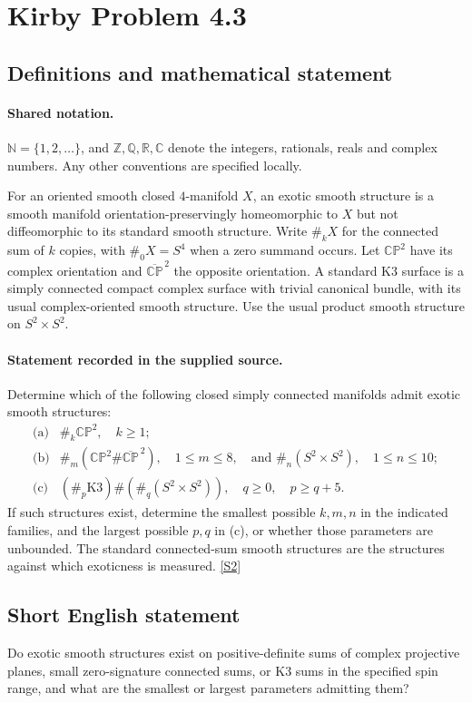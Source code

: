 \documentclass[11pt]{article}
\newcommand{\sref}[2]{\hyperlink{source:#1:#2}{[S#2]}}
\begin{document}
\section{Kirby Problem 4.3}\label{statement}

\subsection{Definitions and mathematical statement}

\paragraph{Shared notation.}$\mathbb N=\{1,2,\ldots\}$, and $\mathbb Z,\mathbb Q,\mathbb R,\mathbb C$ denote the integers, rationals, reals and complex numbers. Any other conventions are specified locally.


For an oriented smooth closed $4$-manifold $X$, an exotic smooth structure is a smooth manifold orientation-preservingly homeomorphic to $X$ but not diffeomorphic to its standard smooth structure. Write $\#_kX$ for the connected sum of $k$ copies, with $\#_0X=S^4$ when a zero summand occurs. Let $\mathbb{CP}^2$ have its complex orientation and $\overline{\mathbb{CP}}^{\,2}$ the opposite orientation. A standard K3 surface is a simply connected compact complex surface with trivial canonical bundle, with its usual complex-oriented smooth structure. Use the usual product smooth structure on $S^2\times S^2$.
\paragraph{Statement recorded in the supplied source.}
Determine which of the following closed simply connected manifolds admit exotic smooth structures:
\[
\begin{array}{ll}
\text{(a)}&\#_k\mathbb{CP}^2,\quad k\ge1;\\[2pt]
\text{(b)}&\#_m(\mathbb{CP}^2\#\overline{\mathbb{CP}}^{\,2}),\quad1\le m\le8,
\quad\text{and }\#_n(S^2\times S^2),\quad1\le n\le10;\\[2pt]
\text{(c)}&(\#_p\mathrm{K3})\#(\#_q(S^2\times S^2)),\quad q\ge0,\quad p\ge q+5.
\end{array}
\]
If such structures exist, determine the smallest possible $k,m,n$ in the indicated families, and the largest possible $p,q$ in (c), or whether those parameters are unbounded. The standard connected-sum smooth structures are the structures against which exoticness is measured. \sref{statement}{2}
\subsection{Short English statement}
Do exotic smooth structures exist on positive-definite sums of complex projective planes, small zero-signature connected sums, or K3 sums in the specified spin range, and what are the smallest or largest parameters admitting them?
\end{document}
